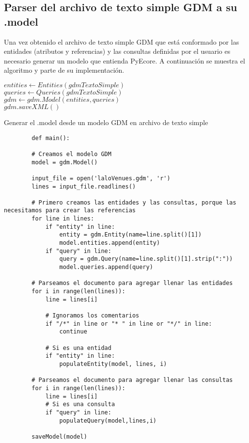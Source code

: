 \subsection{Parser del archivo de texto simple GDM a su .model}
Una vez obtenido el archivo de texto simple GDM que está conformado por las entidades (atributos y referencias) y las consultas definidas por el usuario es necesario generar un modelo que entienda PyEcore. A continuación se muestra el algoritmo y parte de su implementación.

\begin{algorithm}[H]
  
        $entities \gets Entities(gdmTextoSimple)$\\
        $queries \gets Queries(gdmTextoSimple)$\\
        $gdm \gets gdm.Model(entities,queries)$\\
        $gdm.saveXML()$
     
      
    \caption{Generar el .model desde un modelo GDM en archivo de texto simple}
  \end{algorithm}


  \begin{code}
    \label{code:er-to-gdm}
    \begin{verbatim}
        def main():

        # Creamos el modelo GDM
        model = gdm.Model()
        
        input_file = open('laloVenues.gdm', 'r') 
        lines = input_file.readlines()
        
        # Primero creamos las entidades y las consultas, porque las necesitamos para crear las referencias
        for line in lines:
            if "entity" in line:
                entity = gdm.Entity(name=line.split()[1])
                model.entities.append(entity)
            if "query" in line:
                query = gdm.Query(name=line.split()[1].strip(":"))
                model.queries.append(query)
    
        # Parseamos el documento para agregar llenar las entidades
        for i in range(len(lines)):
            line = lines[i]
            
            # Ignoramos los comentarios
            if "/*" in line or "* " in line or "*/" in line:
                continue
            
            # Si es una entidad
            if "entity" in line:
                populateEntity(model, lines, i)
    
        # Parseamos el documento para agregar llenar las consultas
        for i in range(len(lines)):
            line = lines[i]
            # Si es una consulta            
            if "query" in line:
                populateQuery(model,lines,i)
    
        saveModel(model)
    \end{verbatim}
\end{code}